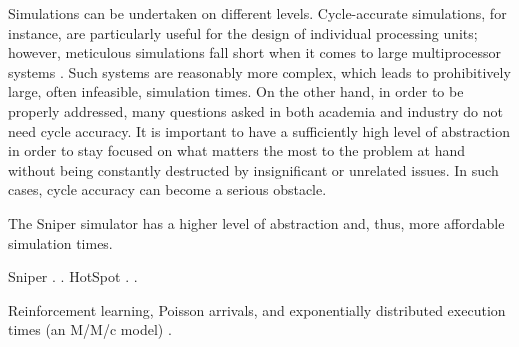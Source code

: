 Simulations can be undertaken on different levels. Cycle-accurate simulations,
for instance, are particularly useful for the design of individual processing
units; however, meticulous simulations fall short when it comes to large
multiprocessor systems \cite{carlson2011}. Such systems are reasonably more
complex, which leads to prohibitively large, often infeasible, simulation times.
On the other hand, in order to be properly addressed, many questions asked in
both academia and industry do not need cycle accuracy. It is important to have a
sufficiently high level of abstraction in order to stay focused on what matters
the most to the problem at hand without being constantly destructed by
insignificant or unrelated issues. In such cases, cycle accuracy can become a
serious obstacle.

The Sniper simulator has a higher level of abstraction \cite{carlson2011} and,
thus, more affordable simulation times.

Sniper \cite{carlson2011}.
 \cite{li2009}.
HotSpot \cite{skadron2004}.
 \cite{sridhar2010}.

Reinforcement learning, Poisson arrivals, and exponentially distributed
execution times (an M/M/c model) \cite{lu2015}.
